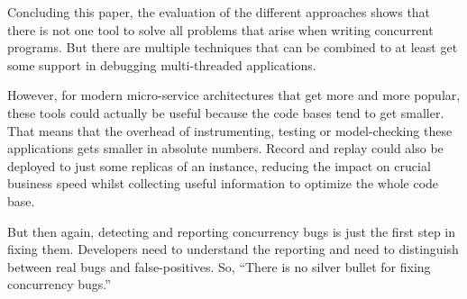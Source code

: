 \documentclass[conference]{IEEEtran}
\begin{document}
Concluding this paper, the evaluation of the different approaches shows that there is not one tool to solve all problems that arise when writing concurrent programs.
But there are multiple techniques that can be combined to at least get some support in debugging multi-threaded applications.

However, for modern micro-service architectures that get more and more popular, these tools could actually be useful because the code bases tend to get smaller.
That means that the overhead of instrumenting, testing or model-checking these applications gets smaller in absolute numbers.
Record and replay could also be deployed to just some replicas of an instance, reducing the impact on crucial business speed whilst collecting useful information to optimize the whole code base.

But then again, detecting and reporting concurrency bugs is just the first step in fixing them.
Developers need to understand the reporting and need to distinguish between real bugs and false-positives.
So, ``There is no silver bullet for fixing concurrency bugs.''~\cite{lu2008mistakes}




\end{document}
